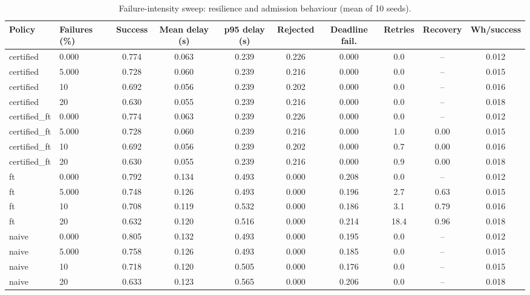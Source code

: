 \begin{table}
\centering
\small
\caption{Failure-intensity sweep: resilience and admission behaviour (mean of 10 seeds).}
\label{tab:p3-failure}
\begin{tabular}{llcccccccc}
\toprule
Policy & Failures (\%) & Success & Mean delay (s) & p95 delay (s) & Rejected & Deadline fail. & Retries & Recovery & Wh/success \\
\midrule
certified & 0.000 & 0.774 & 0.063 & 0.239 & 0.226 & 0.000 & 0.0 & -- & 0.012 \\
certified & 5.000 & 0.728 & 0.060 & 0.239 & 0.216 & 0.000 & 0.0 & -- & 0.015 \\
certified & 10 & 0.692 & 0.056 & 0.239 & 0.202 & 0.000 & 0.0 & -- & 0.016 \\
certified & 20 & 0.630 & 0.055 & 0.239 & 0.216 & 0.000 & 0.0 & -- & 0.018 \\
certified\_ft & 0.000 & 0.774 & 0.063 & 0.239 & 0.226 & 0.000 & 0.0 & -- & 0.012 \\
certified\_ft & 5.000 & 0.728 & 0.060 & 0.239 & 0.216 & 0.000 & 1.0 & 0.00 & 0.015 \\
certified\_ft & 10 & 0.692 & 0.056 & 0.239 & 0.202 & 0.000 & 0.7 & 0.00 & 0.016 \\
certified\_ft & 20 & 0.630 & 0.055 & 0.239 & 0.216 & 0.000 & 0.9 & 0.00 & 0.018 \\
ft & 0.000 & 0.792 & 0.134 & 0.493 & 0.000 & 0.208 & 0.0 & -- & 0.012 \\
ft & 5.000 & 0.748 & 0.126 & 0.493 & 0.000 & 0.196 & 2.7 & 0.63 & 0.015 \\
ft & 10 & 0.708 & 0.119 & 0.532 & 0.000 & 0.186 & 3.1 & 0.79 & 0.016 \\
ft & 20 & 0.632 & 0.120 & 0.516 & 0.000 & 0.214 & 18.4 & 0.96 & 0.018 \\
naive & 0.000 & 0.805 & 0.132 & 0.493 & 0.000 & 0.195 & 0.0 & -- & 0.012 \\
naive & 5.000 & 0.758 & 0.126 & 0.493 & 0.000 & 0.185 & 0.0 & -- & 0.015 \\
naive & 10 & 0.718 & 0.120 & 0.505 & 0.000 & 0.176 & 0.0 & -- & 0.015 \\
naive & 20 & 0.633 & 0.123 & 0.565 & 0.000 & 0.206 & 0.0 & -- & 0.018 \\
\bottomrule
\end{tabular}
\par\vspace{2pt}{\footnotesize\raggedright Rejected $=$ tasks refused by the certificate; deadline fail. $=$ deadline failures per generated task; retries and recovery are undefined (`--`) for policies without a retry mechanism.\par}
\end{table}
